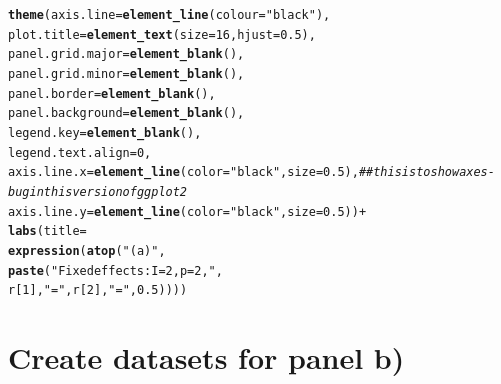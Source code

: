 \documentclass{article}\usepackage[]{graphicx}\usepackage[]{color}
\makeatletter
\newcommand{\hlnum}[1]{\textcolor[rgb]{0.686,0.059,0.569}{#1}}%
\newcommand{\hlstr}[1]{\textcolor[rgb]{0.192,0.494,0.8}{#1}}%
\newcommand{\hlcom}[1]{\textcolor[rgb]{0.678,0.584,0.686}{\textit{#1}}}%
\newcommand{\hlopt}[1]{\textcolor[rgb]{0,0,0}{#1}}%
\newcommand{\hlstd}[1]{\textcolor[rgb]{0.345,0.345,0.345}{#1}}%
\newcommand{\hlkwc}[1]{\textcolor[rgb]{0.333,0.667,0.333}{#1}}%
\newcommand{\hlkwd}[1]{\textcolor[rgb]{0.737,0.353,0.396}{\textbf{#1}}}%
\newenvironment{kframe}{%
 \def\at@end@of@kframe{}%
 \ifinner\ifhmode%
  \def\at@end@of@kframe{\end{minipage}}%
  \begin{minipage}{\columnwidth}%
 \fi\fi%
 \def\FrameCommand##1{\hskip\@totalleftmargin \hskip-\fboxsep
 \colorbox{shadecolor}{##1}\hskip-\fboxsep
     \hskip-\linewidth \hskip-\@totalleftmargin \hskip\columnwidth}%
 \MakeFramed {\advance\hsize-\width
   \@totalleftmargin\z@ \linewidth\hsize
   \@setminipage}}%
 {\par\unskip\endMakeFramed%
 \at@end@of@kframe}
\newenvironment{knitrout}{}{} %
\makeatother
\begin{document}
\begin{knitrout}
\begin{kframe}
\begin{alltt}
  \hlkwd{theme}\hlstd{(}\hlkwc{axis.line} \hlstd{=} \hlkwd{element_line}\hlstd{(}\hlkwc{colour} \hlstd{=} \hlstr{"black"}\hlstd{),}
        \hlkwc{plot.title} \hlstd{=} \hlkwd{element_text}\hlstd{(}\hlkwc{size} \hlstd{=} \hlnum{16}\hlstd{,} \hlkwc{hjust} \hlstd{=} \hlnum{0.5}\hlstd{),}
        \hlkwc{panel.grid.major} \hlstd{=} \hlkwd{element_blank}\hlstd{(),}
        \hlkwc{panel.grid.minor} \hlstd{=} \hlkwd{element_blank}\hlstd{(),}
        \hlkwc{panel.border} \hlstd{=} \hlkwd{element_blank}\hlstd{(),}
        \hlkwc{panel.background} \hlstd{=} \hlkwd{element_blank}\hlstd{(),}
        \hlkwc{legend.key} \hlstd{=} \hlkwd{element_blank}\hlstd{(),}
        \hlkwc{legend.text.align} \hlstd{=} \hlnum{0}\hlstd{,}
        \hlkwc{axis.line.x} \hlstd{=} \hlkwd{element_line}\hlstd{(}\hlkwc{color}\hlstd{=}\hlstr{"black"}\hlstd{,} \hlkwc{size} \hlstd{=} \hlnum{0.5}\hlstd{),} \hlcom{##this is to show axes - bug in this version of ggplot2}
        \hlkwc{axis.line.y} \hlstd{=} \hlkwd{element_line}\hlstd{(}\hlkwc{color}\hlstd{=}\hlstr{"black"}\hlstd{,} \hlkwc{size} \hlstd{=} \hlnum{0.5}\hlstd{))} \hlopt{+}
  \hlkwd{labs}\hlstd{(}\hlkwc{title}\hlstd{=}
         \hlkwd{expression}\hlstd{(}\hlkwd{atop}\hlstd{(}\hlstr{"(a)"}\hlstd{,}
                         \hlkwd{paste}\hlstd{(}\hlstr{"Fixed effects: I = 2, p = 2, "}\hlstd{,}
                               \hlstd{r[}\hlnum{1}\hlstd{],} \hlstr{" = "}\hlstd{, r[}\hlnum{2}\hlstd{],} \hlstr{" = "}\hlstd{,} \hlnum{0.5}\hlstd{))))}
\end{alltt}
\end{kframe}
\end{knitrout}

\section{Create datasets for panel b)}
\end{document}

